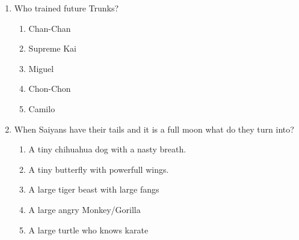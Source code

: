 \documentclass[letterpaper,addpoints,answers,twocolumn,10pt]{exam}
\begin{document}
\begin{enumerate}[leftmargin=.2in]
\begin{enumerate}[noitemsep,leftmargin=0in]
\end{enumerate}



\item  Who trained future Trunks?


\begin{enumerate}[noitemsep,leftmargin=0in]


\item  Chan-Chan
\item  Supreme Kai
\item  Miguel
\item  Chon-Chon
\item  Camilo


\end{enumerate}



\item  When Saiyans have their tails and it is a full moon what do they turn into?


\begin{enumerate}[noitemsep,leftmargin=0in]


\item  A tiny chihuahua dog with a nasty breath.
\item  A tiny butterfly with powerfull wings.
\item  A large tiger beast with large fangs
\item  A large angry Monkey/Gorilla
\item  A large turtle who knows karate


\end{enumerate}



\end{enumerate}
\end{document}
